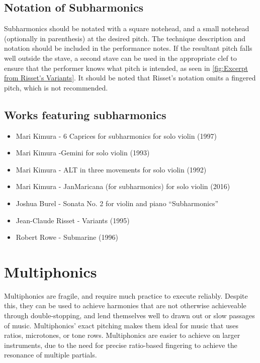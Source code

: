 \subsection{Notation of Subharmonics} \label{sec:notation-subharmonics}
Subharmonics should be notated with a square notehead, and a small notehead (optionally in parenthesis) at the desired pitch.
The technique description and notation should be included in the performance notes.
If the resultant pitch falls well outside the stave, a second stave can be used in the appropriate clef to ensure that the performer knows what pitch is intended, as seen in \autoref{fig:Excerpt from Risset's Variants}.\autocite[]{rissetVariants1995}
It should be noted that Risset's notation omits a fingered pitch, which is not recommended.

\subsection{Works featuring subharmonics }\label{sec:subharmonicsLiterature}

\begin{itemize}
    \item Mari Kimura - 6 Caprices for subharmonics for solo violin (1997) 
    \item Mari Kimura -Gemini for solo violin (1993)
    \item Mari Kimura - ALT in three movements for solo violin (1992)
    \item Mari Kimura - JanMaricana (for subharmonics) for solo violin (2016)
    \item Joshua Burel - Sonata No. 2 for violin and piano “Subharmonics”
    \item Jean-Claude Risset - Variants (1995)
    \item Robert Rowe - Submarine (1996)
\end{itemize}

\section{Multiphonics} \label{sec:multiphonics}

Multiphonics are fragile, and require much practice to execute reliably.
Despite this, they can be used to achieve harmonies that are not otherwise achieveable through double-stopping, and lend themselves well to drawn out or slow passages of music. 
Multiphonics' exact pitching makes them ideal for music that uses ratios, microtones, or tone rows. 
Multiphonics are easier to achieve on larger instruments, due to the need for precise ratio-based fingering to achieve the resonance of multiple partials.

